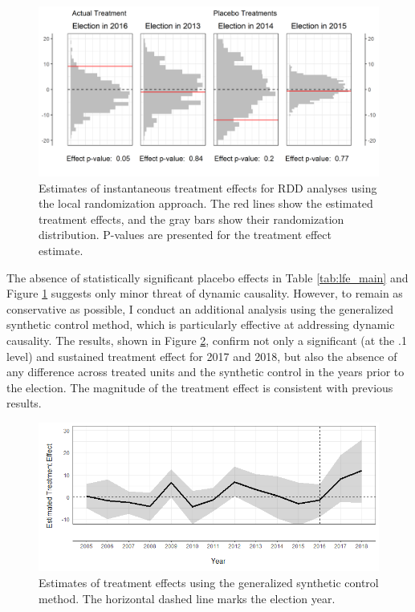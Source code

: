 \documentclass[12pt]{article}
\newcommand{\1}{\mathbbm{1}}
\begin{document}
\begin{figure}[!htbp]
	\centering
	\includegraphics[width=\textwidth]{figure/200205_rdd_results.png}
	\captionsetup{singlelinecheck=off}
	\caption[Estimated RDD treatment effects]{Estimates of instantaneous treatment effects for RDD analyses using the local randomization approach. The red lines show the estimated treatment effects, and the gray bars show their randomization distribution. P-values are presented for the treatment effect estimate.}
	\label{fig:rdd_placebo}
\end{figure}

The absence of statistically significant placebo effects in Table \ref{tab:lfe_main} and Figure \ref{fig:rdd_placebo} suggests only minor threat of dynamic causality. However, to remain as conservative as possible, I conduct an additional analysis using the generalized synthetic control method, which is particularly effective at addressing dynamic causality. The results, shown in Figure \ref{fig:synth_placebo}, confirm not only a significant (at the .1 level) and sustained treatment effect for 2017 and 2018, but also the absence of any difference across treated units and the synthetic control in the years prior to the election. The magnitude of the treatment effect is consistent with previous results.

\begin{figure}[!htbp]
	\centering
	\includegraphics[width=\textwidth]{figure/200205_synth_results.png}
	\captionsetup{singlelinecheck=off}
	\caption[Estimated synthetic control treatment effects]{Estimates of treatment effects using the generalized synthetic control method. The horizontal dashed line marks the election year.}
	\label{fig:synth_placebo}
\end{figure}
\end{document}
